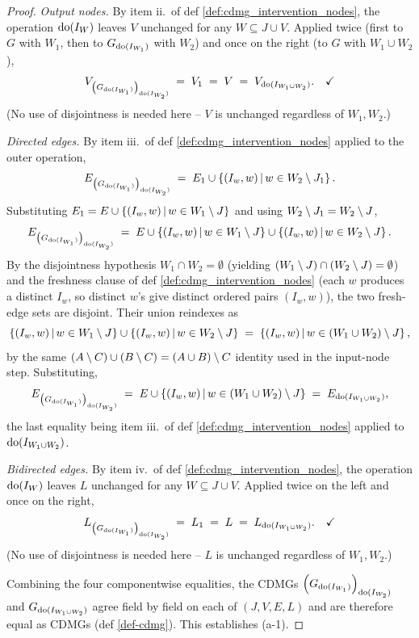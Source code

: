 \documentclass[main]{subfiles}
\begin{document}
\begin{proof}
\medskip\noindent\emph{Output nodes.}
By item ii.\ of def \ref{def:cdmg_intervention_nodes}, the operation $\operatorname{do}(I_W)$ leaves $V$ unchanged for any $W \subseteq J \cup V$. Applied twice (first to $G$ with $W_1$, then to $G_{\operatorname{do}(I_{W_1})}$ with $W_2$) and once on the right (to $G$ with $W_1 \cup W_2$),
\[
    V_{\left ( G_{\operatorname{do}(I_{W_1})} \right )_{\operatorname{do}(I_{W_2})}} \;=\; V_1 \;=\; V \;=\; V_{\operatorname{do}(I_{W_1 \cup W_2})}. \quad \checkmark
\]
(No use of disjointness is needed here -- $V$ is unchanged regardless of $W_1, W_2$.)

\medskip\noindent\emph{Directed edges.}
By item iii.\ of def \ref{def:cdmg_intervention_nodes} applied to the outer operation,
\[
    E_{\left ( G_{\operatorname{do}(I_{W_1})} \right )_{\operatorname{do}(I_{W_2})}} \;=\; E_1 \cup \left \{ (I_w, w) \,\middle|\, w \in W_2 \setminus J_1 \right \}.
\]
Substituting $E_1 = E \cup \left \{ (I_w, w) \,\middle|\, w \in W_1 \setminus J \right \}$ and using $W_2 \setminus J_1 = W_2 \setminus J$,
\[
    E_{\left ( G_{\operatorname{do}(I_{W_1})} \right )_{\operatorname{do}(I_{W_2})}} \;=\; E \cup \left \{ (I_w, w) \,\middle|\, w \in W_1 \setminus J \right \} \cup \left \{ (I_w, w) \,\middle|\, w \in W_2 \setminus J \right \}.
\]
By the disjointness hypothesis $W_1 \cap W_2 = \emptyset$ (yielding $(W_1 \setminus J) \cap (W_2 \setminus J) = \emptyset$) and the freshness clause of def \ref{def:cdmg_intervention_nodes} (each $w$ produces a distinct $I_w$, so distinct $w$'s give distinct ordered pairs $(I_w, w)$), the two fresh-edge sets are disjoint. Their union reindexes as
\[
    \left \{ (I_w, w) \,\middle|\, w \in W_1 \setminus J \right \} \cup \left \{ (I_w, w) \,\middle|\, w \in W_2 \setminus J \right \} \;=\; \left \{ (I_w, w) \,\middle|\, w \in (W_1 \cup W_2) \setminus J \right \},
\]
by the same $(A \setminus C) \cup (B \setminus C) = (A \cup B) \setminus C$ identity used in the input-node step. Substituting,
\[
    E_{\left ( G_{\operatorname{do}(I_{W_1})} \right )_{\operatorname{do}(I_{W_2})}} \;=\; E \cup \left \{ (I_w, w) \,\middle|\, w \in (W_1 \cup W_2) \setminus J \right \} \;=\; E_{\operatorname{do}(I_{W_1 \cup W_2})},
\]
the last equality being item iii.\ of def \ref{def:cdmg_intervention_nodes} applied to $\operatorname{do}(I_{W_1 \cup W_2})$. \checkmark

\medskip\noindent\emph{Bidirected edges.}
By item iv.\ of def \ref{def:cdmg_intervention_nodes}, the operation $\operatorname{do}(I_W)$ leaves $L$ unchanged for any $W \subseteq J \cup V$. Applied twice on the left and once on the right,
\[
    L_{\left ( G_{\operatorname{do}(I_{W_1})} \right )_{\operatorname{do}(I_{W_2})}} \;=\; L_1 \;=\; L \;=\; L_{\operatorname{do}(I_{W_1 \cup W_2})}. \quad \checkmark
\]
(No use of disjointness is needed here -- $L$ is unchanged regardless of $W_1, W_2$.)

\smallskip
Combining the four componentwise equalities, the CDMGs $\left ( G_{\operatorname{do}(I_{W_1})} \right )_{\operatorname{do}(I_{W_2})}$ and $G_{\operatorname{do}(I_{W_1 \cup W_2})}$ agree field by field on each of $(J, V, E, L)$ and are therefore equal as CDMGs (def \ref{def-cdmg}). This establishes (a-1).


\end{proof}
\end{document}
